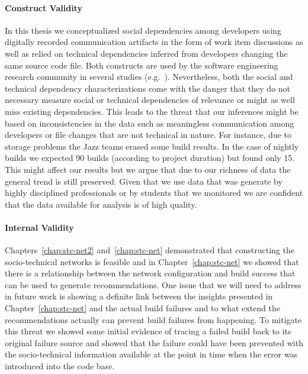 \paragraph{Construct Validity}
In this thesis we conceptualized social dependencies among developers using digitally recorded communication artifacts in the form of work item discussions as well as relied on technical dependencies inferred from developers changing the same source code file.
Both constructs are used by the software engineering research community in several studies (e.g.~\cite{cataldo:cscw:2006}).
Nevertheless, both the social and technical dependency characterizations come with the danger that they do not necessary measure social or technical dependencies of relevance or might as well miss existing dependencies.
This leads to the threat that our inferences might be based on inconsistencies in the data such as meaningless communication among developers or file changes that are not technical in nature.
For instance, due to storage problems the Jazz teams erased some build results. In the case of
nightly builds we expected 90 builds (according to project duration) but found
only 15. This might affect our results but we argue that due to our richness of
data the general trend is still preserved.
Given that we use data that was generate by highly disciplined professionals or by students that we monitored we are confident that the data available for analysis is of high quality.

\paragraph{Internal Validity}
Chapters~\ref{chap:stc-net2} and~\ref{chap:stc-net} demonstrated that constructing the socio-technical networks is feasible and in Chapter~\ref{chap:stc-net} we showed that there is a relationship between the network configuration and build success that can be used to generate recommendations.
One issue that we will need to address in future work is showing a definite link between the insights presented in Chapter~\ref{chap:stc-net} and the actual build failures and to what extend the recommendations actually can prevent build failures from happening. 
To mitigate this threat we showed some initial evidence of tracing a failed build back to its original failure source and showed that the failure could have been prevented with the socio-technical information available at the point in time when the error was introduced into the code base.

